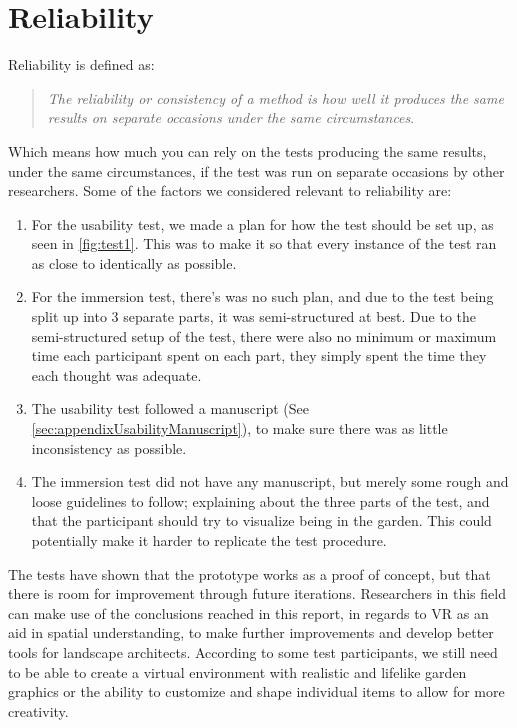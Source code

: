 \section*{Reliability}
	Reliability is defined as:\\
	\begin{quote}
		\textit{The reliability or consistency of a method is how well it produces the same results on separate occasions under the same circumstances}\cite[p.~442~Box~13.3]{interactionDesign}.\\
	\end{quote}
	Which means how much you can rely on the tests producing the same results, under the same circumstances, if the test was run on separate occasions by other researchers. Some of the factors we considered relevant to reliability are:\\
	\begin{enumerate}
		\item For the usability test, we made a plan for how the test should be set up, as seen in \autoref{fig:test1}. This was to make it so that every instance of the test ran as close to identically as possible.\\
		
		\item For the immersion test, there's was no such plan, and due to the test being split up into 3 separate parts, it was semi-structured at best. Due to the semi-structured setup of the test, there were also no minimum or maximum time each participant spent on each part, they simply spent the time they each thought was adequate.\\
		
		\item The usability test followed a manuscript (See \autoref{sec:appendixUsabilityManuscript}), to make sure there was as little inconsistency as possible.\\
		
		\item The immersion test did not have any manuscript, but merely some rough and loose guidelines to follow; explaining about the three parts of the test, and that the participant should try to visualize being in the garden. This could potentially make it harder to replicate the test procedure.\\
	\end{enumerate}

	The tests have shown that the prototype works as a proof of concept, but that there is room for improvement through future iterations. Researchers in this field can make use of the conclusions reached in this report, in regards to VR as an aid in spatial understanding, to make further improvements and develop better tools for landscape architects. According to some test participants, we still need to be able to create a virtual environment with realistic and lifelike garden graphics or the ability to customize and shape individual items to allow for more creativity.
